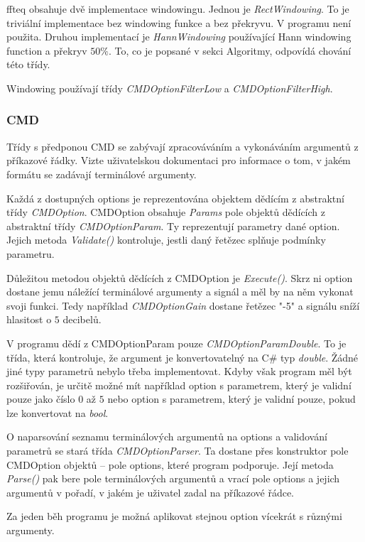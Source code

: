 \documentclass{article}
\begin{document}
ffteq obsahuje dvě implementace windowingu. Jednou je \emph{RectWindowing}. To
je triviální implementace bez windowing funkce a bez překryvu. V programu není
použita. Druhou implementací je \emph{HannWindowing} používající Hann windowing
function a překryv $50\%$. To, co je popsané v sekci Algoritmy, odpovídá
chování této třídy.

Windowing používají třídy \emph{CMDOptionFilterLow} a
\emph{CMDOptionFilterHigh}.

\subsubsection*{CMD}
Třídy s předponou CMD se zabývají zpracováváním a vykonáváním argumentů z
příkazové řádky. Vizte uživatelskou dokumentaci pro informace o tom, v jakém
formátu se zadávají terminálové argumenty.

Každá z dostupných options je reprezentována objektem dědícím z abstraktní
třídy \emph{CMDOption}. CMDOption obsahuje \emph{Params} pole objektů dědících
z abstraktní třídy \emph{CMDOptionParam}. Ty reprezentují parametry dané
option. Jejich metoda \emph{Validate()} kontroluje, jestli daný řetězec splňuje
podmínky parametru.

Důležitou metodou objektů dědících z CMDOption je \emph{Execute()}. Skrz ni
option dostane jemu náležící terminálové argumenty a signál a měl by na něm
vykonat svoji funkci. Tedy například \emph{CMDOptionGain} dostane řetězec "-5"
a signálu sníží hlasitost o $5$ decibelů.

V programu dědí z CMDOptionParam pouze \emph{CMDOptionParamDouble}. To je
třída, která kontroluje, že argument je konvertovatelný na C\# typ
\emph{double}. Žádné jiné typy parametrů nebylo třeba implementovat. Kdyby však
program měl být rozšiřován, je určitě možné mít například option s parametrem,
který je validní pouze jako číslo $0$ až $5$ nebo option s parametrem, který je
validní pouze, pokud lze konvertovat na \emph{bool}.

O naparsování seznamu terminálových argumentů na options a validování parametrů
se stará třída \emph{CMDOptionParser}. Ta dostane přes konstruktor pole
CMDOption objektů -- pole options, které program podporuje. Její metoda
\emph{Parse()} pak bere pole terminálových argumentů a vrací pole options a
jejich argumentů v pořadí, v jakém je uživatel zadal na příkazové řádce.

Za jeden běh programu je možná aplikovat stejnou option vícekrát s různými
argumenty.
\end{document}

